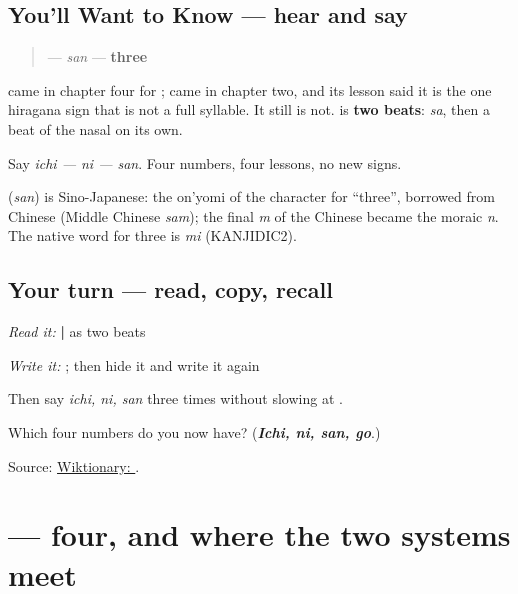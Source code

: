 \subsection*{You'll Want to Know — hear and say}
\begin{quote}
\textbf{} — \emph{san} — \textbf{three}
\end{quote}

\textbf{} came in chapter four for \textbf{}; \textbf{} came in chapter two, and its lesson said it is the one hiragana sign that is not a full syllable. It still is not. \textbf{} is \textbf{two beats}: \emph{sa}, then a beat of the nasal on its own.

Say \emph{ichi — ni — san}. Four numbers, four lessons, no new signs.

\begin{cousinweb}
\textbf{} (\emph{san}) is Sino-Japanese: the on'yomi of the character for \textquotedblleft{}three\textquotedblright{}, borrowed from Chinese (Middle Chinese \emph{sam}); the final \emph{m} of the Chinese became the moraic \emph{n}. The native word for three is \emph{mi} (KANJIDIC2).
\end{cousinweb}

\subsection*{Your turn — read, copy, recall}
\emph{Read it:} \textbf{ | } as two beats

\emph{Write it:} \textbf{}; then hide it and write it again

Then say \emph{ichi, ni, san} three times without slowing at \textbf{}.

\begin{tcolorbox}[breakable,colback=teal!4,colframe=teal!35!black,title={Before you move on}]
Which four numbers do you now have? (\emph{\textbf{Ichi, ni, san, go}}.)

Source: \href{https://en.wiktionary.org/wiki/\%E3\%81\%95\%E3\%82\%93}{Wiktionary: }.
\end{tcolorbox}
\section[\texorpdfstring{\ja{よん} (yon)}{よん (yon)}]{ — four, and where the two systems meet}

\label{lesson:JA-C14-yon}



